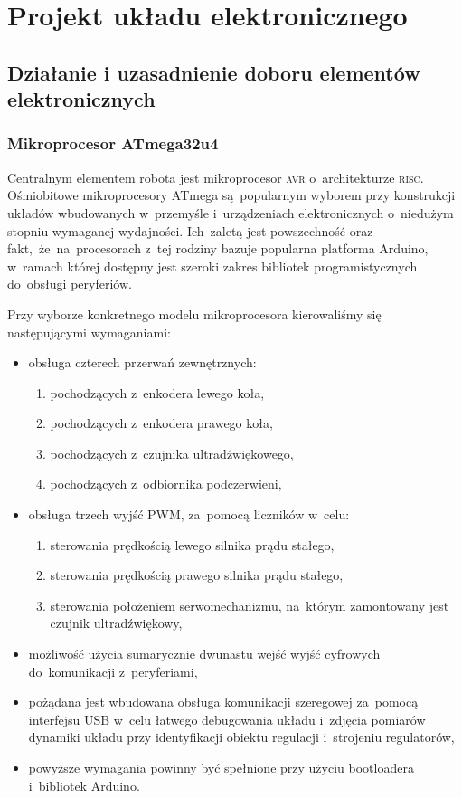 \documentclass[11pt]{article}
\begin{document}
\section{Projekt układu elektronicznego}
\subsection{Działanie i uzasadnienie doboru elementów elektronicznych}
\subsubsection{Mikroprocesor ATmega32u4}
Centralnym elementem robota jest mikroprocesor \textsc{avr} o~architekturze \textsc{risc}. Ośmiobitowe mikroprocesory ATmega są~popularnym wyborem przy konstrukcji układów wbudowanych w~przemyśle i~urządzeniach elektronicznych o~niedużym stopniu wymaganej wydajności.
Ich~zaletą jest powszechność oraz fakt,~że~na~procesorach z~tej rodziny bazuje popularna platforma Arduino, w~ramach której dostępny jest szeroki zakres bibliotek programistycznych do~obsługi peryferiów. 

\noindent\begin{minipage}{\linewidth}
Przy wyborze konkretnego modelu mikroprocesora kierowaliśmy się następującymi wymaganiami:
\begin{itemize}
	\item obsługa czterech przerwań zewnętrznych:
		\begin{enumerate}
			\item pochodzących z~enkodera lewego koła,
			\item pochodzących z~enkodera prawego koła,
			\item pochodzących z~czujnika ultradźwiękowego,
			\item pochodzących z~odbiornika podczerwieni, 
		\end{enumerate}
	\item obsługa trzech wyjść PWM, za~pomocą liczników w~celu:
		\begin{enumerate}
			\item sterowania prędkością lewego silnika prądu stałego,
			\item sterowania prędkością prawego silnika prądu stałego,
			\item sterowania położeniem serwomechanizmu, na~którym zamontowany jest czujnik ultradźwiękowy,
		\end{enumerate}
	\item możliwość użycia sumarycznie dwunastu wejść wyjść cyfrowych do~komunikacji z~peryferiami,
	\item pożądana jest wbudowana obsługa komunikacji szeregowej za~pomocą interfejsu USB w~celu łatwego debugowania układu i~zdjęcia pomiarów dynamiki układu przy identyfikacji obiektu regulacji i~strojeniu regulatorów,
	\item powyższe wymagania powinny być spełnione przy użyciu bootloadera i~bibliotek Arduino.
\end{itemize}
\hspace{5mm}
\end{minipage}
\end{document}
